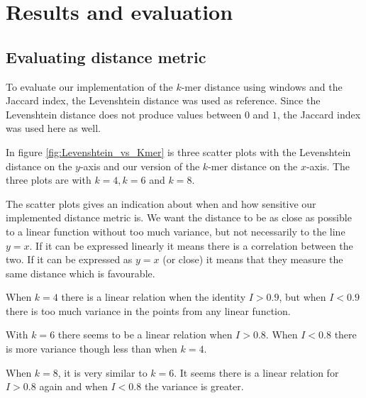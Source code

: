 \section{Results and evaluation} \label{sec:results}

\subsection{Evaluating distance metric}

To evaluate our implementation of the $k$-mer distance using windows and the
Jaccard index, the Levenshtein distance was used as reference. Since the
Levenshtein distance does not produce values between $0$ and $1$, the Jaccard
index was used here as well.

In figure \ref{fig:Levenshtein_vs_Kmer} is three scatter plots with the
Levenshtein distance on the $y$-axis and our version of the $k$-mer distance on
the $x$-axis. The three plots are with $k=4, k=6$ and $k=8$.

The scatter plots gives an indication about when and how sensitive our
implemented distance metric is. We want the distance to be as close as possible
to a linear function without too much variance, but not necessarily to the line
$y=x$. If it can be expressed linearly it means there is a correlation between
the two. If it can be expressed as $y=x$ (or close) it means that they measure
the same distance which is favourable.

When $k=4$ there is a linear relation when the identity $I>0.9$, but when
$I<0.9$ there is too much variance in the points from any linear function.

With $k=6$ there seems to be a linear relation when $I>0.8$. When $I<0.8$ there
is more variance though less than when $k=4$.

When $k=8$, it is very similar to $k=6$. It seems there is a linear relation
for $I>0.8$ again and when $I<0.8$ the variance is greater.

